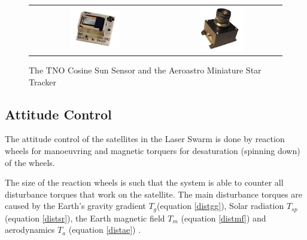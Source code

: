 \begin{figure} [h]
\centering
\begin{tabular}{c c}
\includegraphics[width = 0.4\textwidth, bb=0 0 240px 180px]{chapters/img/CoSS.jpg} & \includegraphics[width = 0.4\textwidth, bb=0 0 219px 215px]{chapters/img/MSTracker.png}
\end{tabular}
\caption[Sun sensor and star tracker]{The TNO Cosine Sun Sensor \cite{tnoweb} and the Aeroastro Miniature Star Tracker \cite{aeromst}}
\label{fig:sunstar}
\end{figure}

\subsection{Attitude Control}
\label{ss:emDDacs}
The attitude control of the satellites in the Laser Swarm is done by reaction wheels for manoeuvring and magnetic torquers for desaturation (spinning down) of the wheels. 

The size of the reaction wheels is such that the system is able to counter all disturbance torques that work on the satellite. The main disturbance torques are caused by the Earth's gravity gradient $T_g$(equation \ref{distgg}), Solar radiation $T_{sp}$ (equation \ref{distsr}), the Earth magnetic field $T_m$ (equation \ref{distmf}) and aerodynamics $T_a$ (equation \ref{distae}) \cite{larson}.

